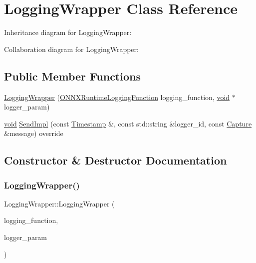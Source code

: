 \hypertarget{classLoggingWrapper}{}\section{Logging\+Wrapper Class Reference}
\label{classLoggingWrapper}


Inheritance diagram for Logging\+Wrapper\+:


Collaboration diagram for Logging\+Wrapper\+:
\subsection*{Public Member Functions}
\begin{DoxyCompactItemize}
\item 
\mbox{\hyperlink{classLoggingWrapper_a2716db098d93f0d21a8c0235d036ed17}{Logging\+Wrapper}} (\mbox{\hyperlink{onnxruntime__c__api_8h_a34bca4a0e659ffc0e729444e5a5ed677}{O\+N\+N\+X\+Runtime\+Logging\+Function}} logging\+\_\+function, \mbox{\hyperlink{mlasi_8h_a88f941d423cb2a819b70a1358982b1a6}{void}} $\ast$logger\+\_\+param)
\item 
\mbox{\hyperlink{mlasi_8h_a88f941d423cb2a819b70a1358982b1a6}{void}} \mbox{\hyperlink{classLoggingWrapper_a3b2d19d153cf366c7db19986e81c7f60}{Send\+Impl}} (const \mbox{\hyperlink{namespaceonnxruntime_1_1logging_ae7a2a84f622a028e2ad495a74289012d}{Timestamp}} \&, const std\+::string \&logger\+\_\+id, const \mbox{\hyperlink{classonnxruntime_1_1logging_1_1Capture}{Capture}} \&message) override
\end{DoxyCompactItemize}


\subsection{Constructor \& Destructor Documentation}
\mbox{\label{classLoggingWrapper_a2716db098d93f0d21a8c0235d036ed17}} 
\subsubsection{\texorpdfstring{Logging\+Wrapper()}{LoggingWrapper()}}
{\footnotesize\ttfamily Logging\+Wrapper\+::\+Logging\+Wrapper (\begin{DoxyParamCaption}\item[{\mbox{\hyperlink{onnxruntime__c__api_8h_a34bca4a0e659ffc0e729444e5a5ed677}{O\+N\+N\+X\+Runtime\+Logging\+Function}}}]{logging\+\_\+function,  }\item[{\mbox{\hyperlink{mlasi_8h_a88f941d423cb2a819b70a1358982b1a6}{void}} $\ast$}]{logger\+\_\+param }\end{DoxyParamCaption})\hspace{0.3cm}{\ttfamily [inline]}}



